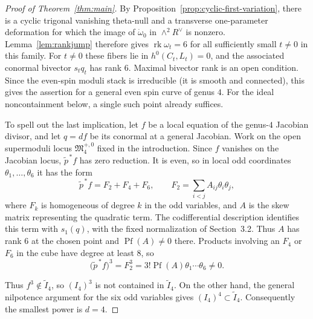 \documentclass[11pt]{article}
\newcommand{\FM}{\mathfrak M}
\begin{document}
\begin{proof}[Proof of Theorem~\ref{thm:main}]
By Proposition~\ref{prop:cyclic-first-variation}, there is a cyclic
trigonal vanishing theta-null and a transverse one-parameter deformation
for which the image of $\dot\omega_0$ in $\wedge^2R^\vee$ is nonzero.
Lemma~\ref{lem:rankjump} therefore gives
$\operatorname{rk}\omega_t=6$ for all sufficiently small $t\neq0$ in
this family.
{For $t\neq0$ these fibers lie in $h^0(C_t,L_t)=0$, and the
associated conormal bivector $s_tq_t$ has rank $6$. Maximal bivector
rank is an open condition. Since the even-spin moduli stack is
irreducible (it is smooth and connected), this gives the assertion for
a general even spin curve of genus $4$. For the ideal noncontainment
below, a single such point already suffices.}

To spell out the last implication, let $f$ be a local equation of the
genus-$4$ Jacobian divisor, and let $q=df$ be its conormal at a general
Jacobian.
{Work on the open supermoduli locus $\FM_4^{+,0}$ fixed in the introduction.}
\begingroup
Since $f$ vanishes on the Jacobian locus, $\widetilde p^{\,*}f$ has
zero reduction. It is even, so in local odd coordinates
$\theta_1,\ldots,\theta_6$ it has the form
\[
\widetilde p^{\,*}f=F_2+F_4+F_6,\qquad
F_2=\sum_{i<j}A_{ij}\theta_i\theta_j,
\]
where $F_k$ is homogeneous of degree $k$ in the odd variables, and $A$ is the skew matrix
representing the quadratic term. The codifferential description
identifies this term with $s_1(q)$, with the fixed normalization of
Section~3.2. Thus $A$ has rank $6$ at the chosen point and
$\operatorname{Pf}(A)\neq0$ there. Products involving an $F_4$ or
$F_6$ in the cube have degree at least $8$, so
\[
\bigl(\widetilde p^{\,*}f\bigr)^3
=F_2^3=3!\operatorname{Pf}(A)\theta_1\cdots\theta_6\neq0.
\]
\endgroup

Thus $f^3\notin\widetilde I_4$, so $(I_4)^3$ is not contained in
$\widetilde I_4$.  On the other hand, the general nilpotence argument
for the six odd variables gives $(I_4)^4\subset\widetilde I_4$.
Consequently the smallest power is $d=4$.
\end{proof}
\end{document}
